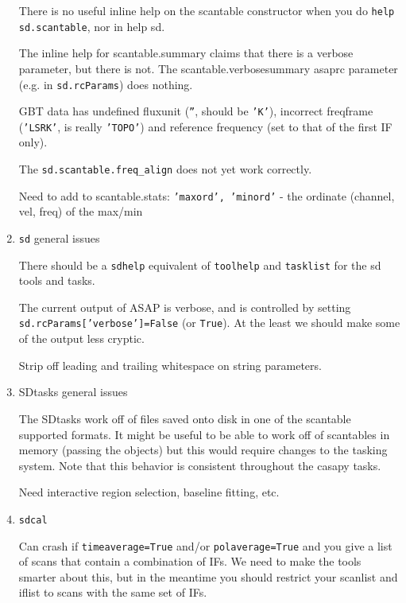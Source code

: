 \begin{enumerate}
  There is no useful inline help on the scantable constructor
  when you do {\tt help sd.scantable}, nor in {help sd}.

  The inline help for scantable.summary claims that there is
  a verbose parameter, but there is not.  The scantable.verbosesummary
  asaprc parameter (e.g. in {\tt sd.rcParams}) does nothing.

  GBT data has undefined fluxunit ({\tt ''}, should be {\tt 'K'}), 
  incorrect freqframe ({\tt 'LSRK'}, is really {\tt 'TOPO'}) and reference
  frequency (set to that of the first IF only).


  The {\tt sd.scantable.freq\_align} does not yet work correctly.

  Need to add to scantable.stats:
      {\tt 'maxord', 'minord'} - the ordinate (channel, vel, freq) 
      of the max/min
  
\item {\tt sd} general issues

  There should be a {\tt sdhelp} equivalent of {\tt toolhelp}
  and {\tt tasklist} for the sd tools and tasks.

  The current output of ASAP is verbose, and is controlled by
  setting {\tt sd.rcParams['verbose']=False} (or {\tt True}).
  At the least we should make some of the output less cryptic.

  Strip off leading and trailing whitespace on string parameters.

\item SDtasks general issues

  The SDtasks work off of files saved onto disk in one of the 
  scantable supported formats.  It might be useful to be able to
  work off of scantables in memory (passing the objects) but this
  would require changes to the tasking system.  Note that this
  behavior is consistent throughout the casapy tasks.

  Need interactive region selection, baseline fitting, etc.

\item {\tt sdcal}

  Can crash if {\tt timeaverage=True} and/or {\tt polaverage=True}
  and you give a
  list of scans that contain a combination of IFs.  We need to make
  the tools smarter about this, but in the meantime you should restrict
  your scanlist and iflist to scans with the same set of IFs.


\end{enumerate}
